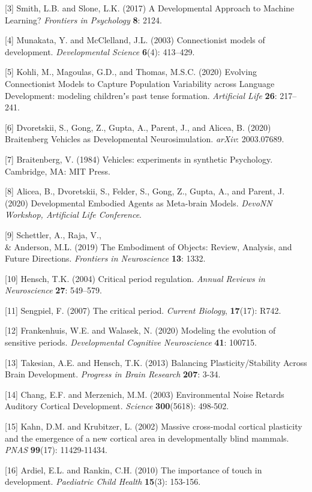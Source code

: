 \documentclass{article}
\begin{document}
[3] Smith, L.B. and Slone, L.K. (2017) A Developmental Approach to Machine Learning? {\it Frontiers in Psychology} {\bf 8}: 2124.

[4] Munakata, Y. and  McClelland, J.L. (2003) Connectionist models of development. {\it Developmental Science} {\bf 6}(4): 413–429.

[5] Kohli, M., Magoulas, G.D., and Thomas, M.S.C. (2020) Evolving Connectionist Models to Capture Population Variability across Language Development: modeling childrenʼs past tense formation. {\it Artificial Life} {\bf 26}: 217–241.

[6] Dvoretskii, S., Gong, Z., Gupta, A., Parent, J., and Alicea, B. (2020) Braitenberg Vehicles as Developmental Neurosimulation. {\it arXiv}: 2003.07689.

[7] Braitenberg, V. (1984) Vehicles: experiments in synthetic Psychology. Cambridge, MA: MIT Press.

[8] Alicea, B., Dvoretskii, S., Felder, S., Gong, Z., Gupta, A., and Parent, J. (2020) Developmental Embodied Agents as Meta-brain Models. {\it DevoNN Workshop, Artificial Life Conference}.

[9] Schettler, A., Raja, V., \\& Anderson, M.L. (2019) The Embodiment of Objects: Review, Analysis, and Future Directions. {\it Frontiers in Neuroscience} {\bf 13}: 1332.

[10] Hensch, T.K. (2004)  Critical period regulation. {\it Annual Reviews in Neuroscience} {\bf 27}: 549–579.

[11] Sengpiel, F. (2007) The critical period. {\it Current Biology}, {\bf 17}(17): R742.

[12] Frankenhuis, W.E. and Walasek, N. (2020) Modeling the evolution of sensitive periods. {\it Developmental Cognitive Neuroscience} {\bf 41}: 100715.

[13] Takesian, A.E. and Hensch, T.K. (2013) Balancing Plasticity/Stability Across Brain Development. {\it Progress in Brain Research} {\bf 207}: 3-34.

[14] Chang, E.F. and Merzenich, M.M. (2003) Environmental Noise Retards Auditory Cortical Development. {\it Science} {\bf 300}(5618): 498-502.

[15] Kahn, D.M. and Krubitzer, L. (2002) Massive cross-modal cortical plasticity and the emergence of a new cortical area in developmentally blind mammals. {\it PNAS} {\bf 99}(17): 11429-11434.

[16] Ardiel, E.L. and Rankin, C.H. (2010) The importance of touch in development. {\it Paediatric Child Health} {\bf 15}(3): 153-156.
\end{document}
